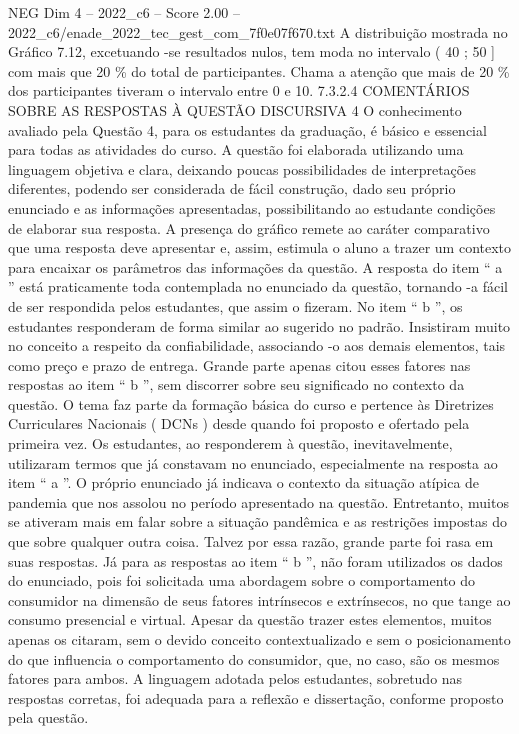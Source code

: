 \begin{textsample}{NEG Dim 4 – 2022\_c6 – Score 2.00 – 2022\_c6/enade\_2022\_tec\_gest\_com\_7f0e07f670.txt}
A distribuição mostrada no Gráfico 7.12, excetuando -se resultados nulos, tem moda no intervalo ( 40 ; 50 ] com mais que 20 \% do total de participantes.
Chama a atenção que mais de 20 \% dos participantes tiveram o intervalo entre 0 e 10. 7.3.2.4 COMENTÁRIOS SOBRE AS RESPOSTAS À QUESTÃO DISCURSIVA 4 O conhecimento avaliado pela Questão 4, para os estudantes da graduação, é básico e essencial para todas as atividades do curso.
A questão foi elaborada utilizando uma linguagem objetiva e clara, deixando poucas possibilidades de interpretações diferentes, podendo ser considerada de fácil construção, dado seu próprio enunciado e as informações apresentadas, possibilitando ao estudante condições de elaborar sua resposta.
A presença do gráfico remete ao caráter comparativo que uma resposta deve apresentar e, assim, estimula o aluno a trazer um contexto para encaixar os parâmetros das informações da questão.
A resposta do item “ a ” está praticamente toda contemplada no enunciado da questão, tornando -a fácil de ser respondida pelos estudantes, que assim o fizeram.
No item “ b ”, os estudantes responderam de forma similar ao sugerido no padrão.
Insistiram muito no conceito a respeito da confiabilidade, associando -o aos demais elementos, tais como preço e prazo de entrega.
Grande parte apenas citou esses fatores nas respostas ao item “ b ”, sem discorrer sobre seu significado no contexto da questão.
O tema faz parte da formação básica do curso e pertence às Diretrizes Curriculares Nacionais ( DCNs ) desde quando foi proposto e ofertado pela primeira vez.
Os estudantes, ao responderem à questão, inevitavelmente, utilizaram termos que já constavam no enunciado, especialmente na resposta ao item “ a ”.
O próprio enunciado já indicava o contexto da situação atípica de pandemia que nos assolou no período apresentado na questão.
Entretanto, muitos se ativeram mais em falar sobre a situação pandêmica e as restrições impostas do que sobre qualquer outra coisa.
Talvez por essa razão, grande parte foi rasa em suas respostas.
Já para as respostas ao item “ b ”, não foram utilizados os dados do enunciado, pois foi solicitada uma abordagem sobre o comportamento do consumidor na dimensão de seus fatores intrínsecos e extrínsecos, no que tange ao consumo presencial e virtual.
Apesar da questão trazer estes elementos, muitos apenas os citaram, sem o devido conceito contextualizado e sem o posicionamento do que influencia o comportamento do consumidor, que, no caso, são os mesmos fatores para ambos.
A linguagem adotada pelos estudantes, sobretudo nas respostas corretas, foi adequada para a reflexão e dissertação, conforme proposto pela questão.

\end{textsample}
